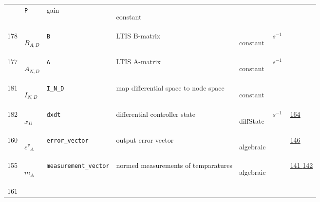\begin{longtable}{|p{1cm}|p{2.5cm}|p{4.5cm}|p{8cm}|p{3.0cm}|p{3cm}|p{1cm}|}
             & \verb|P|
             & gain
             & \begin{lay}constant \end{lay}
             & $  $
             & \\
            178
             & \hypertarget{"v:178"}{ $ {B}{_{A, D}} $}
             & \verb|B|
             & LTIS B-matrix
             & \begin{lay}constant \end{lay}
             & $ s^{-1} \, $
             & \\
            177
             & \hypertarget{"v:177"}{ $ {A}{_{N, D}} $}
             & \verb|A|
             & LTIS A-matrix 
             & \begin{lay}constant \end{lay}
             & $ s^{-1} \, $
             & \\
            181
             & \hypertarget{"v:181"}{ $ {I}{_{N, D}} $}
             & \verb|I_N_D|
             & map differential space to node space
             & \begin{lay}constant \end{lay}
             & $  $
             & \\
            182
             & \hypertarget{"v:182"}{ $ {{\dot{x}}}{_{D}} $}
             & \verb|dxdt|
             & differential controller state
             & \begin{lay}diffState \end{lay}
             & $ s^{-1} \, $
             &                 \hyperlink{"e:164"}{ 164 }
                 \\
            160
             & \hypertarget{"v:160"}{ $ {{e^{v}}}{_{A}} $}
             & \verb|error_vector|
             & output error vector
             & \begin{lay}algebraic \end{lay}
             & $  $
             &                 \hyperlink{"e:146"}{ 146 }
                 \\
            155
             & \hypertarget{"v:155"}{ $ {m}{_{A}} $}
             & \verb|measurement_vector|
             & normed measurements of temparatures
             & \begin{lay}algebraic \end{lay}
             & $  $
             &                 \hyperlink{"e:141"}{ 141 }
                                 \hyperlink{"e:142"}{ 142 }
                 \\
            161

\end{longtable}
